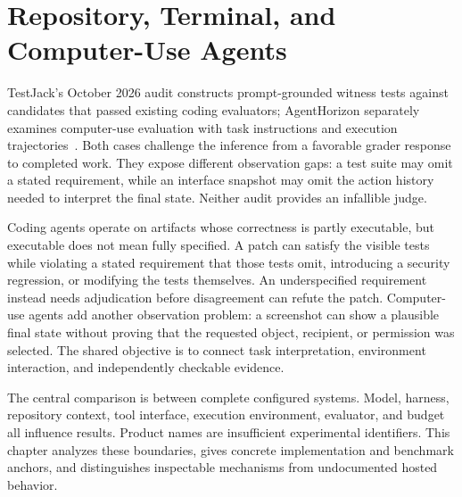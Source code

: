 \chapter{Repository, Terminal, and Computer-Use Agents}\label{ch:C23}
TestJack's October 2026 audit constructs prompt-grounded witness tests against candidates that passed existing coding evaluators; AgentHorizon separately examines computer-use evaluation with task instructions and execution trajectories~\cite{yao2026testjack,corpus261011050}. Both cases challenge the inference from a favorable grader response to completed work. They expose different observation gaps: a test suite may omit a stated requirement, while an interface snapshot may omit the action history needed to interpret the final state. Neither audit provides an infallible judge.

Coding agents operate on artifacts whose correctness is partly executable, but executable does not mean fully specified. A patch can satisfy the visible tests while violating a stated requirement that those tests omit, introducing a security regression, or modifying the tests themselves. An underspecified requirement instead needs adjudication before disagreement can refute the patch. Computer-use agents add another observation problem: a screenshot can show a plausible final state without proving that the requested object, recipient, or permission was selected. The shared objective is to connect task interpretation, environment interaction, and independently checkable evidence.

The central comparison is between complete configured systems. Model, harness, repository context, tool interface, execution environment, evaluator, and budget all influence results. Product names are insufficient experimental identifiers. This chapter analyzes these boundaries, gives concrete implementation and benchmark anchors, and distinguishes inspectable mechanisms from undocumented hosted behavior.









